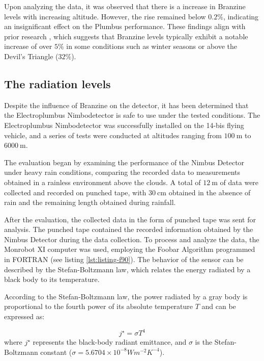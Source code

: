 \documentclass[english]{cenarticle} %
\begin{document}
%
Upon analyzing the data, it was observed that there is a increase in Branzine levels with increasing altitude. However, the rise remained below $0.2\%$, indicating an insignificant effect on the Plumbus performance. These findings align with prior research \citep{Gagaia1923}, which suggests that Branzine levels typically exhibit a notable increase of over $5\%$ in some conditions such as winter seasons or above the Devil's Triangle ($32\%$).
%
\subsection{The radiation levels}
%
Despite the influence of Branzine on the detector, it has been determined that the Electroplumbus Nimbodetector is safe to use under the tested conditions. The Electroplumbus Nimbodetector was successfully installed on the 14-bis flying vehicle, and a series of tests were conducted at altitudes ranging from $\SI{100}{\meter}$ to $\SI{6000}{\meter}$.\par
%
The evaluation began by examining the performance of the Nimbus Detector under heavy rain conditions, comparing the recorded data to measurements obtained in a rainless environment above the clouds. A total of $\SI{12}{\meter}$ of data were collected and recorded on punched tape, with $\SI{30}{\centi\meter}$ obtained in the absence of rain and the remaining length obtained during rainfall.\par
%
After the evaluation, the collected data in the form of punched tape was sent for analysis. The punched tape contained the recorded information obtained by the Nimbus Detector during the data collection. To process and analyze the data, the Monrobot XI computer was used, employing the Foobar Algorithm programmed in FORTRAN (see listing \ref{lst:listing-f90}). The behavior of the sensor can be described by the Stefan-Boltzmann law, which relates the energy radiated by a black body to its temperature.\par
%
According to the Stefan-Boltzmann law, the power radiated by a gray body is proportional to the fourth power of its absolute temperature $T$ and can be expressed as:\par
%
\vspace{-10mm}
\begin{equation}\label{StefanBoltzmannLaw}
j^{\star}=\sigma T^{4}
\end{equation}
%
\noindent where $j^{\star}$ represents the black-body radiant emittance, and $\sigma$ is the Stefan-Boltzmann constant ($\sigma=5.6704\times10^{-8} Wm^{-2}K^{-4}$).
\end{document}
